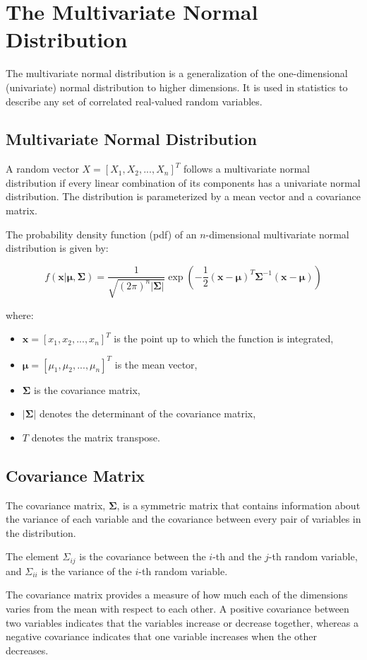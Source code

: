 \chapter{The Multivariate Normal Distribution}

The multivariate normal distribution is a generalization of the
one-dimensional (univariate) normal distribution to higher
dimensions. It is used in statistics to describe any set of correlated
real-valued random variables. 

\section{Multivariate Normal Distribution}

A random vector $X = [X_1, X_2, ..., X_n]^T$ follows a multivariate
normal distribution if every linear combination of its components has
a univariate normal distribution. The distribution is parameterized by
a mean vector and a covariance matrix.

The probability density function (pdf) of an $n$-dimensional
multivariate normal distribution is given by:

\begin{equation*}
f(\mathbf{x}|\boldsymbol\mu, \mathbf{\Sigma}) = \frac{1}{\sqrt{(2\pi)^n|\mathbf{\Sigma}|}}\exp\left(-\frac{1}{2}(\mathbf{x}-\boldsymbol\mu)^T\mathbf{\Sigma}^{-1}(\mathbf{x}-\boldsymbol\mu)\right)
\end{equation*}

where:
\begin{itemize}
\item $\mathbf{x} = [x_1, x_2, ..., x_n]^T$ is the point up to which the function is integrated,
\item $\boldsymbol\mu = [\mu_1, \mu_2, ..., \mu_n]^T$ is the mean vector,
\item $\mathbf{\Sigma}$ is the covariance matrix,
\item $|\mathbf{\Sigma}|$ denotes the determinant of the covariance matrix,
\item $T$ denotes the matrix transpose.
\end{itemize}

\section{Covariance Matrix}

The covariance matrix, $\mathbf{\Sigma}$, is a symmetric matrix that
contains information about the variance of each variable and the
covariance between every pair of variables in the distribution.

The element $\Sigma_{ij}$ is the covariance between the $i$-th and the
$j$-th random variable, and $\Sigma_{ii}$ is the variance of the
$i$-th random variable.

The covariance matrix provides a measure of how much each of the
dimensions varies from the mean with respect to each other. A positive
covariance between two variables indicates that the variables increase
or decrease together, whereas a negative covariance indicates that one
variable increases when the other decreases.
